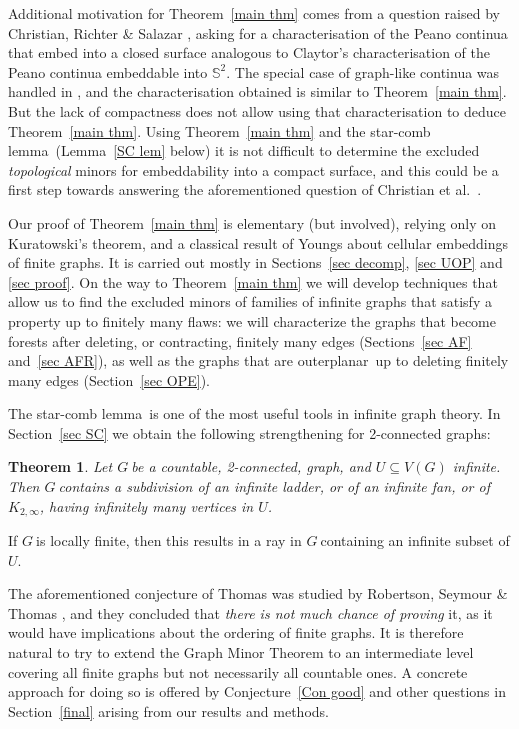 \documentclass{article}
\newtheorem{theorem}[proposition]{Theorem}
\newcommand{\BS}{\ensuremath{\mathbb S}}
\newcommand{\g}{\ensuremath{G\ }}
\newcommand{\OP}{outerplanar}
\newcommand{\Lr}[1]{Lemma~\ref{#1}}
\newcommand{\Tr}[1]{Theorem~\ref{#1}}
\newcommand{\Sr}[1]{Section~\ref{#1}}
\newcommand{\Srs}[1]{Sections~\ref{#1}}
\newcommand{\Cnr}[1]{Con\-jecture~\ref{#1}}
\newcommand{\lf}{locally finite}
\newcommand{\scl}{star-comb lemma}
\begin{document}
Additional motivation for \Tr{main thm} comes from a question raised by Christian, Richter \& Salazar \cite{christian_embedding_2015}, asking for a characterisation of the Peano continua that embed into a closed surface analogous to Claytor's \cite{ClaPea} characterisation of the Peano continua embeddable into $\BS^2$. The special case of graph-like continua was handled in \cite{christian_embedding_2015}, and the characterisation obtained is similar to \Tr{main thm}. But the lack of compactness does not allow using that  characterisation to deduce \Tr{main thm}. Using \Tr{main thm} and the \scl\ (\Lr{SC lem} below) it is not difficult to determine the excluded \emph{topological} minors for embeddability into a compact surface, and this could be a first step towards answering the aforementioned question of Christian et al.\ \cite{christian_embedding_2015}. 

\medskip
Our proof of \Tr{main thm} is elementary (but involved), relying only on Kuratowski's theorem, and a classical result of Youngs about cellular embeddings of finite graphs. It is carried out mostly in \Srs{sec decomp}, \ref{sec UOP} and \ref{sec proof}. On the way to \Tr{main thm} we will develop techniques that allow us to find the excluded minors of families of infinite graphs that satisfy a property up to finitely many flaws: we will characterize the graphs that become forests after deleting, or contracting, finitely many edges  (\Srs{sec AF} and~\ref{sec AFR}), as well as the graphs that are \OP\ up to deleting finitely many edges (\Sr{sec OPE}).

\medskip
The \scl\ is one of the most useful tools in infinite graph theory. In \Sr{sec SC} we obtain the following strengthening for 2-connected graphs:

\begin{theorem} \label{SC 2con intro}
Let \g be a countable, 2-connected, graph, and $U\subseteq V(G)$ infinite. Then \g contains a subdivision of an infinite ladder, or of an infinite fan, or of $K_{2,\infty}$, having infinitely many vertices in $U$.
\end{theorem}
If \g is \lf, then this results in a ray in \g containing an infinite subset of $U$. 

\medskip
The aforementioned conjecture of Thomas was studied by Robertson, Seymour \& Thomas \cite{RoSeThExcI,RoSeThExcII}, and they concluded that {\it there is not much chance of proving} it, as it would have implications about the ordering of finite graphs. It is therefore natural to try to extend the Graph Minor Theorem to an intermediate level covering all finite graphs but not necessarily all countable ones. A concrete approach for doing so is offered by \Cnr{Con good} and other questions in \Sr{final} arising from our results and methods.
\end{document}
